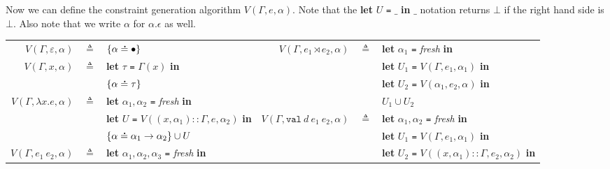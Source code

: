\documentclass{article}
\theoremstyle{definition}
\newcommand*{\cons}{::}
\newcommand*{\A}[1]{\overset{\,_{\mbox{\Large .}}}{#1}}
\newcommand*{\modid}{d}
\newcommand*{\link}[2]{{#1}\rtimes{#2}}
\newcommand*{\Lete}{\mathtt{val}}
\begin{document}
Now we can define the constraint generation algorithm $V(\Gamma,e,\alpha)$.
Note that the \textbf{let} $U$ \texttt{=} $\_$ \textbf{in} $\_$ notation returns $\bot$ if the right hand side is $\bot$.
Also note that we write $\alpha$ for $\alpha.\epsilon$ as well.

\begin{flushright}\end{flushright}
\hspace{-2.5em}
\begin{tabular}{rclrcl}
	$V(\Gamma,\varepsilon,\alpha)$ & $\triangleq$ & $\{\alpha\A{=}\bullet\}$                                                             & $V(\Gamma,\link{e_1}{e_2},\alpha)$         & $\triangleq$ & \textbf{let} $\alpha_1$ \texttt{=} \textit{fresh} \textbf{in}                       \\
	$V(\Gamma,x,\alpha)$           & $\triangleq$ & \textbf{let} $\tau$ \texttt{=} $\Gamma(x)$ \textbf{in}                               &                                            &              & \textbf{let} $U_1$ \texttt{=} $V(\Gamma,e_1,\alpha_1)$ \textbf{in}                  \\
	                               &              & $\{\alpha\A{=}\tau\}$                                                                &                                            &              & \textbf{let} $U_2$ \texttt{=} $V(\alpha_1,e_2,\alpha)$  \textbf{in}                 \\
	$V(\Gamma,\lambda x.e,\alpha)$ & $\triangleq$ & \textbf{let} $\alpha_1,\alpha_2$ \texttt{=} \textit{fresh} \textbf{in}               &                                            &              & $U_1\cup U_2$                                                                       \\
	                               &              & \textbf{let} $U$ \texttt{=} $V((x,\alpha_1)\cons\Gamma,e,\alpha_2)$ \textbf{in}      & $V(\Gamma,\Lete\:\modid\:e_1\:e_2,\alpha)$ & $\triangleq$ & \textbf{let} $\alpha_1,\alpha_2$ \texttt{=} \textit{fresh} \textbf{in}              \\
	                               &              & $\{\alpha\A{=}\alpha_1\rightarrow\alpha_2\}\cup U$                                   &                                            &              & \textbf{let} $U_1$ \texttt{=} $V(\Gamma,e_1,\alpha_1)$ \textbf{in}                  \\
	$V(\Gamma,e_1\:e_2,\alpha)$    & $\triangleq$ & \textbf{let} $\alpha_1,\alpha_2,\alpha_3$ \texttt{=} \textit{fresh} \textbf{in}      &                                            &              & \textbf{let} $U_2$ \texttt{=} $V((x,\alpha_1)\cons\Gamma,e_2,\alpha_2)$ \textbf{in} \\

\end{tabular}
\end{document}
